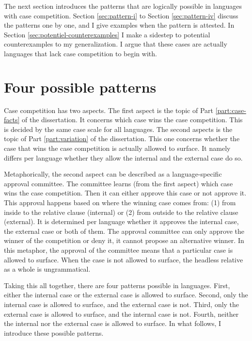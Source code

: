 The next section introduces the patterns that are logically possible in languages with case competition. Section \ref{sec:pattern-i} to Section \ref{sec:pattern-iv} discuss the patterns one by one, and I give examples when the pattern is attested. In Section \ref{sec:potentiel-counterexamples} I make a sidestep to potential counterexamples to my generalization. I argue that these cases are actually languages that lack case competition to begin with.


\section{Four possible patterns}\label{sec:possible-patterns}

Case competition has two aspects. The first aspect is the topic of Part \ref{part:case-facts} of the dissertation. It concerns which case wins the case competition. This is decided by the same case scale for all languages. The second aspects is the topic of Part \ref{part:variation} of the dissertation. This one concerns whether the case that wins the case competition is actually allowed to surface. It namely differs per language whether they allow the internal and the external case do so.

Metaphorically, the second aspect can be described as a language-specific approval committee. The committee learns (from the first aspect) which case wins the case competition. Then it can either approve this case or not approve it. This approval happens based on where the winning case comes from: (1) from inside to the relative clause (internal) or (2) from outside to the relative clause (external). It is determined per language whether it approves the internal case, the external case or both of them. The approval committee can only approve the winner of the competition or deny it, it cannot propose an alternative winner. In this metaphor, the approval of the committee means that a particular case is allowed to surface. When the case is not allowed to surface, the headless relative as a whole is ungrammatical.

Taking this all together, there are four patterns possible in languages. First, either the internal case or the external case is allowed to surface. Second, only the internal case is allowed to surface, and the external case is not. Third, only the external case is allowed to surface, and the internal case is not. Fourth, neither the internal nor the external case is allowed to surface. In what follows, I introduce these possible patterns.

